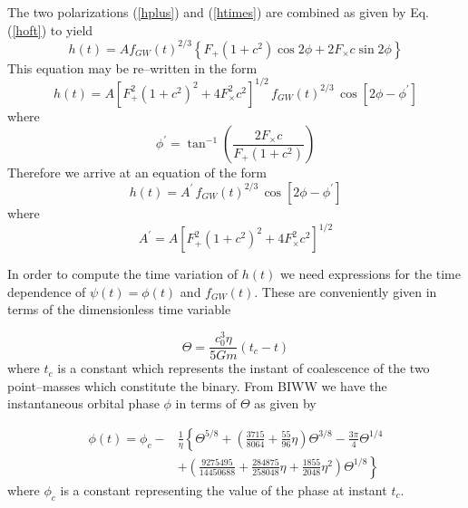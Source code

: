 \documentclass[12pt]{article}
\begin{document}
The two polarizations (\ref{hplus}) and (\ref{htimes}) are combined as given by Eq.(\ref{hoft}) to yield
\begin{equation}
h(t) = A f_{GW}(t)^{2/3} \left\{ F_{+} (1+c^{2}) \cos 2 \phi + 2F_{\times} c \sin 2 \phi \right\}
\end{equation}
This equation may be re--written in the form
\begin{equation}
h(t) = A \left[F^{2}_{+} (1+c^{2})^{2} + 4 F^{2}_{\times} c^{2} \right]^{1/2} \, f_{GW}(t)^{2/3} \, \cos \left[ 2 \phi - \phi^{\prime} \right]
\end{equation}
where
\begin{equation}
\phi^{\prime} = \tan^{-1} \left( \frac{2 F_{\times} c}{F_{+} (1+c^{2})} \right)
\end{equation}
Therefore we arrive at an equation of the form
\begin{equation}
h(t) = A^{\prime} \, f_{GW}(t)^{2/3} \, \cos \left[ 2 \phi - \phi^{\prime} \right]
\label{hoft2}
\end{equation}
where
\begin{equation}
A^{\prime} = A \left[F^{2}_{+} (1+c^{2})^{2} + 4 F^{2}_{\times} c^{2} \right]^{1/2}
\end{equation}




In order to compute the time variation of $h(t)$ we need expressions for the time dependence of $\psi(t)=\phi(t)$ and $f_{GW}(t)$. These are conveniently given in terms of the dimensionless time variable

\begin{equation}
\Theta = \frac{c^{3}_{0} \eta}{5Gm} (t_{c} - t)
\end{equation}
where $t_{c}$ is a constant which represents the instant of coalescence of the two point--masses which constitute the binary. From BIWW we have the instantaneous orbital phase $\phi$ in terms of $\Theta$ as given by

\begin{equation}
\begin{split}
\phi(t) = \phi_{c} - &  \frac{1}{\eta} \left\{ \Theta^{5/8} + \left( \frac{3715}{8064} + \frac{55}{96} \eta \right) \Theta^{3/8} - \frac{3 \pi}{4} \Theta^{1/4} \right.  \\
                     &  + \left. \left( \frac{9275495}{14450688} + \frac{284875}{258048} \eta + \frac{1855}{2048} \eta^{2} \right) \Theta^{1/8} \right\}
\end{split}
\label{phioft}
\end{equation} 
where $\phi_{c}$ is a constant representing the value of the phase at instant $t_{c}$.
\end{document}
